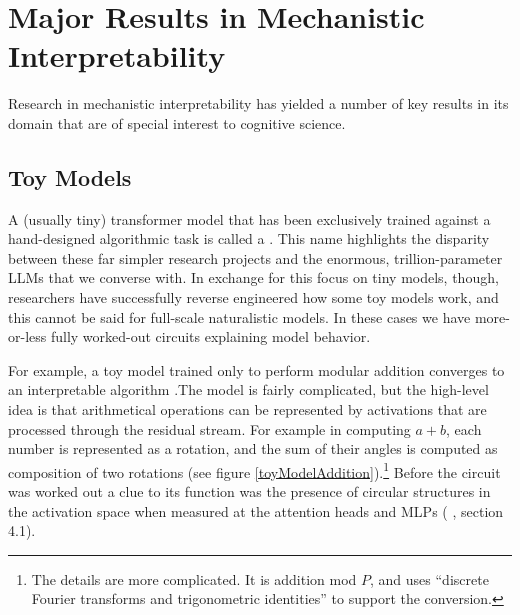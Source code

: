 


\section{Major Results in Mechanistic Interpretability}

Research in mechanistic interpretability has yielded a number of key results in
its domain that are of special interest to cognitive science.

\subsection{Toy Models}

A (usually tiny) transformer model that has been exclusively trained against a
hand-designed algorithmic task is called a . This name
highlights the disparity between these far simpler research projects and the
enormous, trillion-parameter LLMs that we converse with. In exchange for this
focus on tiny models, though, researchers have successfully reverse engineered
how some toy models work, and this cannot be said for full-scale naturalistic
models. In these cases we have more-or-less fully worked-out circuits
explaining model behavior.

For example, a toy model trained only to perform modular addition converges to
an interpretable algorithm \cite{nanda2023progress}.The model is fairly
complicated, but the high-level idea is that arithmetical operations can be
represented by activations that are processed through the residual stream. For
example in computing $a + b$, each number is represented as a rotation, and the
sum of their angles is computed as composition of two rotations (see figure
\ref{toyModelAddition}).\footnote{The details are more complicated. It is
addition mod $P$, and uses ``discrete Fourier transforms and trigonometric
identities'' \cite{nanda2023progress} to support the conversion.} Before the
circuit was worked out a clue to its function was the presence of circular
structures in the activation space when measured at the attention heads and
MLPs (\cite{nanda2023progress} , section 4.1).

